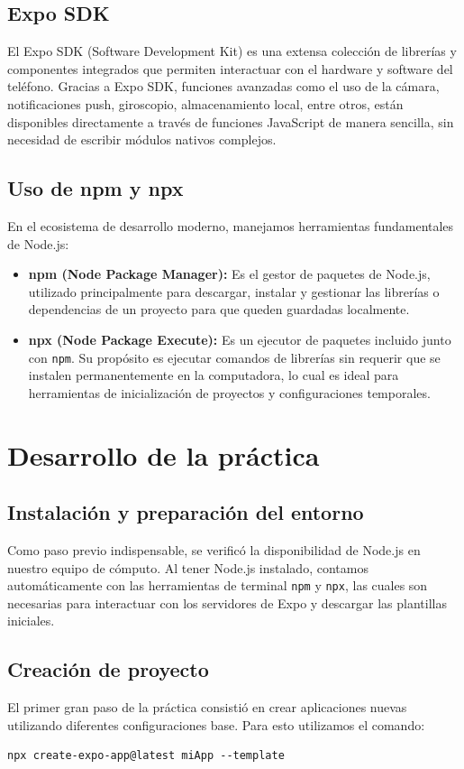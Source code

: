 \documentclass[12pt,a4paper]{article}
\begin{document}
\subsection{Expo SDK}
El Expo SDK (Software Development Kit) es una extensa colección de librerías y componentes integrados que permiten interactuar con el hardware y software del teléfono. Gracias a Expo SDK, funciones avanzadas como el uso de la cámara, notificaciones push, giroscopio, almacenamiento local, entre otros, están disponibles directamente a través de funciones JavaScript de manera sencilla, sin necesidad de escribir módulos nativos complejos.

\subsection{Uso de npm y npx}
En el ecosistema de desarrollo moderno, manejamos herramientas fundamentales de Node.js:
\begin{itemize}
    \item \textbf{npm (Node Package Manager):} Es el gestor de paquetes de Node.js, utilizado principalmente para descargar, instalar y gestionar las librerías o dependencias de un proyecto para que queden guardadas localmente.
    \item \textbf{npx (Node Package Execute):} Es un ejecutor de paquetes incluido junto con \texttt{npm}. Su propósito es ejecutar comandos de librerías sin requerir que se instalen permanentemente en la computadora, lo cual es ideal para herramientas de inicialización de proyectos y configuraciones temporales.
\end{itemize}

\section{Desarrollo de la práctica}

\subsection{Instalación y preparación del entorno}
Como paso previo indispensable, se verificó la disponibilidad de Node.js en nuestro equipo de cómputo. Al tener Node.js instalado, contamos automáticamente con las herramientas de terminal \texttt{npm} y \texttt{npx}, las cuales son necesarias para interactuar con los servidores de Expo y descargar las plantillas iniciales.

\subsection{Creación de proyecto}
El primer gran paso de la práctica consistió en crear aplicaciones nuevas utilizando diferentes configuraciones base. Para esto utilizamos el comando:
\begin{verbatim}
npx create-expo-app@latest miApp --template
\end{verbatim}
\end{document}
